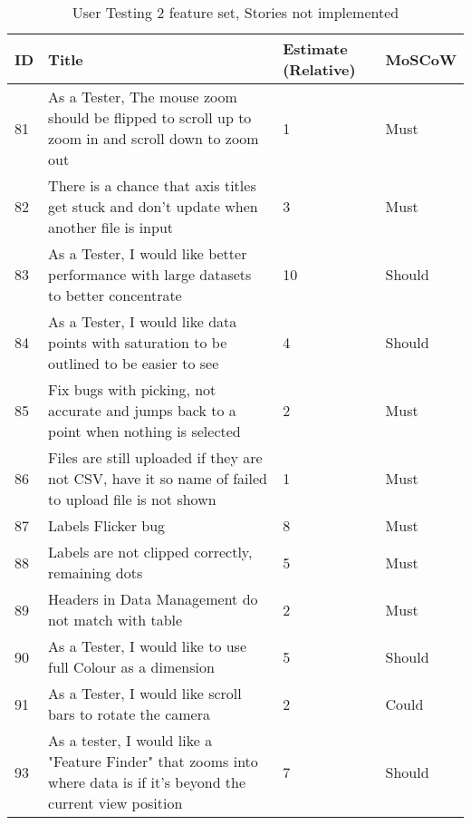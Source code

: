 \begin{table*}[hbt!]
    \begin{tabularx}{\textwidth}{ | X | X | X | X | }
        \hline
        ID & Title                                                                                                               & Estimate (Relative) & MoSCoW \\
        \hline
        81 & As a Tester, The mouse zoom should be flipped to scroll up to zoom in and scroll down to zoom out                   & 1                   & Must   \\
        \hline
        82 & There is a chance that axis titles get stuck and don't update when another file is input                            & 3                   & Must   \\
        \hline
        83 & As a Tester, I would like better performance with large datasets to better concentrate                              & 10                  & Should \\
        \hline
        84 & As a Tester, I would like data points with saturation to be outlined to be easier to see                            & 4                   & Should \\
        \hline
        85 & Fix bugs with picking, not accurate and jumps back to a point when nothing is selected                              & 2                   & Must   \\
        \hline
        86 & Files are still uploaded if they are not CSV, have it so name of failed to upload file is not shown                 & 1                   & Must   \\
        \hline
        87 & Labels Flicker bug                                                                                                  & 8                   & Must   \\
        \hline
        88 & Labels are not clipped correctly, remaining dots                                                                    & 5                   & Must   \\
        \hline
        89 & Headers in Data Management do not match with table                                                                  & 2                   & Must   \\
        \hline
        90 & As a Tester, I would like to use full Colour as a dimension                                                         & 5                   & Should \\
        \hline
        91 & As a Tester, I would like scroll bars to rotate the camera                                                          & 2                   & Could  \\
        \hline
        93 & As a tester, I would like a "Feature Finder" that zooms into where data is if it's beyond the current view position & 7                   & Should \\
        \hline
    \end{tabularx}
    \caption{User Testing 2 feature set, Stories not implemented}
    \label{UT2}
\end{table*}


